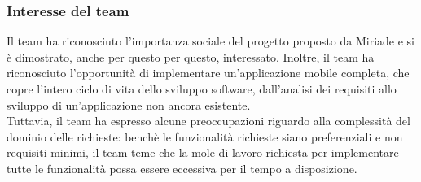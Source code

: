 \documentclass[a4paper,11pt]{article}
\begin{document}
\subsubsection{Interesse del team}
\parbox[t]{\linewidth}{%
Il team ha riconosciuto l'importanza sociale del progetto proposto da Miriade e si è dimostrato, anche per questo per questo, interessato.
Inoltre, il team ha riconosciuto l'opportunità di implementare un'applicazione mobile completa, che copre l'intero ciclo di vita dello sviluppo software, dall'analisi dei requisiti allo sviluppo di un'applicazione non ancora esistente.
\\ Tuttavia, il team ha espresso alcune preoccupazioni riguardo alla complessità del dominio delle richieste: benchè le funzionalità richieste siano preferenziali e non requisiti minimi, il team teme che la mole di lavoro richiesta per implementare tutte le funzionalità possa essere eccessiva per il tempo a disposizione.
}
\end{document}
